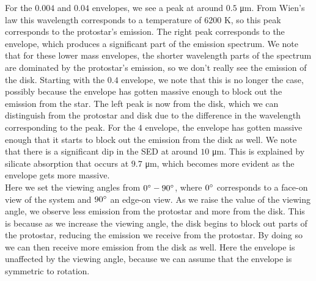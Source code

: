 \documentclass[11pt]{article}
\newenvironment{tight_enumerate}{
    \begin{enumerate}[label=(\alph*)]
    \setlength{\itemsep}{3pt}
    \setlength{\parskip}{0pt}}
    {\end{enumerate}}
\begin{document}
\begin{tight_enumerate}
\begin{figure}[h]
\end{figure}
For the $0.004$ and $0.04$ \si{\msun} envelopes, we see a peak at around $0.5$ \si{\micro\meter}. From Wien's law this wavelength corresponds to a temperature of $6200$ \si{\kelvin}, so this peak corresponds to the protostar's emission. The right peak corresponds to the envelope, which produces a significant part of the emission spectrum. We note that for these lower mass envelopes, the shorter wavelength parts of the spectrum are dominated by the protostar's emission, so we don't really see the emission of the disk. Starting with the $0.4$ \si{\msun} envelope, we note that this is no longer the case, possibly because the envelope has gotten massive enough to block out the emission from the star. The left peak is now from the disk, which we can distinguish from the protostar and disk due to the difference in the wavelength corresponding to the peak. For the $4$ \si{\msun} envelope, the envelope has gotten massive enough that it starts to block out the emission from the disk as well. We note that there is a significant dip in the SED at around $10$ \si{\micro\meter}. This is explained by silicate absorption that occurs at $9.7$ \si{\micro\meter}, which becomes more evident as the envelope gets more massive.\\
\indent\hspace{1em} Here we set the viewing angles from $0\degree - 90\degree$, where $0\degree$ corresponds to a face-on view of the system and $90\degree$ an edge-on view. As we raise the value of the viewing angle, we observe less emission from the protostar and more from the disk. This is because as we increase the viewing angle, the disk begins to block out parts of the protostar, reducing the emission we receive from the protostar. By doing so we can then receive more emission from the disk as well. Here the envelope is unaffected by the viewing angle, because we can assume that the envelope is symmetric to rotation.


\end{tight_enumerate}
\end{document}
